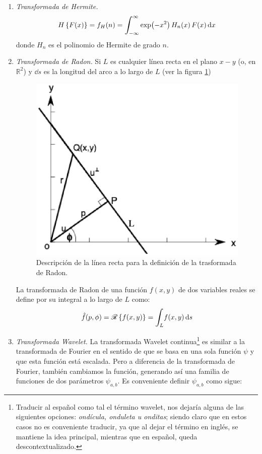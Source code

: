 \begin{enumerate}
\item \emph{Transformada de Hermite.}
\begin{align}
H \left\{ F(x) \right\} = f_{H} (n) = \scaleint{6ex}_{\bs -\infty}^{\infty} \exp(-x^{2}) \, H_{n} (x) \, F(x) \dd{x}
\label{eq:ecuacion_17_2_1}
\end{align}
donde $H_{n}$ es el polinomio de Hermite de grado $n$.
\item \emph{Transformada de Radon.}
Si $L$ es cualquier línea recta en el plano $x-y$ (o, en $\mathbb{R}^{2}$) y $\dd{s}$ es la longitud del arco a lo largo de $L$ (ver la figura \ref{eq:figura_Radon})
\begin{figure}[H]
    \centering
    \includegraphics[scale=0.7]{Imagenes/Transformada_Radon_01.eps}
    \caption{Descripción de la línea recta para la definición de la trasformada de Radon.}
    \label{eq:figura_Radon}
\end{figure}
La transformada de Radon de una función $f (x, y)$ de dos variables reales se define por su integral a lo largo de $L$ como:
\begin{align}
\hat{f} (p, \phi) = \mathscr{R} \left\{ f(x, y) \right\} = \scaleint{6ex}_{\bs L} f(x, y) \dd{s}
\label{eq:ecuacion_18_2_1}
\end{align}
\item \emph{Transformada Wavelet.}
La transformada Wavelet continua\footnote{Traducir al español como tal el término wavelet, nos dejaría alguna de las siguientes opciones: \emph{ondícula, onduleta u onditas}; siendo claro que en estos casos no es conveniente traducir, ya que al dejar el término en inglés, se mantiene la idea principal, mientras que en español, queda descontextualizado.} es similar a la transformada de Fourier en el sentido de que se basa en una sola función $\psi$ y que esta función está escalada. Pero a diferencia de la transformada de Fourier, también cambiamos la función, generando así una familia de funciones de dos parámetros $\psi_{a, b}$. Es conveniente definir $\psi_{a, b}$ como sigue:

\end{enumerate}
